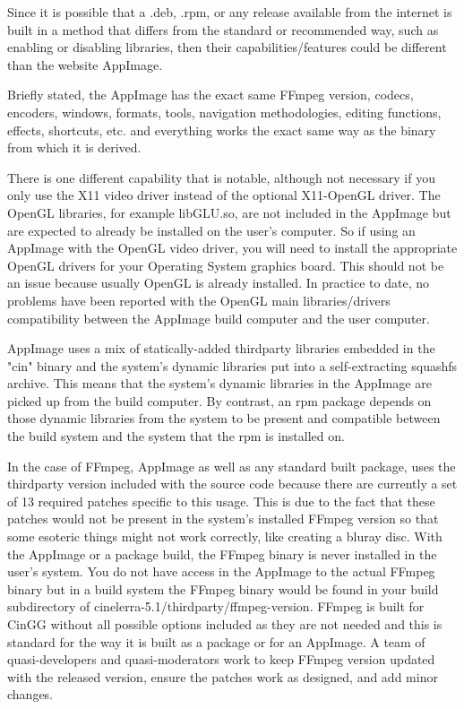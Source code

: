 Since it is possible that a .deb, .rpm, or any release available from the internet
is built in a method that differs from the standard or recommended way, such as
enabling or disabling libraries, then their capabilities/features could be
different than the \CGG{} website AppImage.

Briefly stated, the AppImage has the exact same FFmpeg version, codecs, encoders,
windows, formats, tools, navigation methodologies, editing functions, effects,
shortcuts, etc. and everything works the exact same way as the binary from which it
is derived.

There is one different capability that is notable, although not necessary if you
only use the X11 video driver instead of the optional X11-OpenGL driver. The OpenGL
libraries, for example libGLU.so, are not included in the AppImage but are expected
to already be installed on the user's computer. So if using an AppImage with the
OpenGL video driver, you will need to install the appropriate OpenGL drivers for your
Operating System graphics board. This should not be an issue because usually OpenGL
is already installed. In practice to date, no problems have been reported with the 
OpenGL main libraries/drivers compatibility between the AppImage build computer and
the user computer.

AppImage uses a mix of statically-added thirdparty libraries embedded in the "cin"
binary and the system's dynamic libraries put into a self-extracting squashfs 
archive. This means that the system's dynamic libraries in the AppImage are
picked up from the build computer.  By contrast, an rpm package depends on those
dynamic libraries from the system to be present and compatible between the build
system and the system that the rpm is installed on.

In the case of FFmpeg, AppImage as well as any standard built package, uses the
thirdparty version included with the \CGG{} source code because there are currently
a set of 13 required patches specific to this usage.  This is due to the fact that
these patches would not be present in the system's installed FFmpeg version so that
some esoteric things might not work correctly, like creating a bluray disc.
With the AppImage or a package build, the \CGG{} FFmpeg binary is never installed
in the user's system.  You do not have access in the AppImage to the actual FFmpeg
binary but in a build system the FFmpeg binary would be found in
your build subdirectory of cinelerra-5.1/thirdparty/ffmpeg-version. FFmpeg is
built for CinGG without all possible options included as they are not needed and
this is standard for the way it is built as a package or for an AppImage. A team
of quasi-developers and quasi-moderators work to keep FFmpeg version updated with
the released version, ensure the patches work as designed, and add minor changes.

